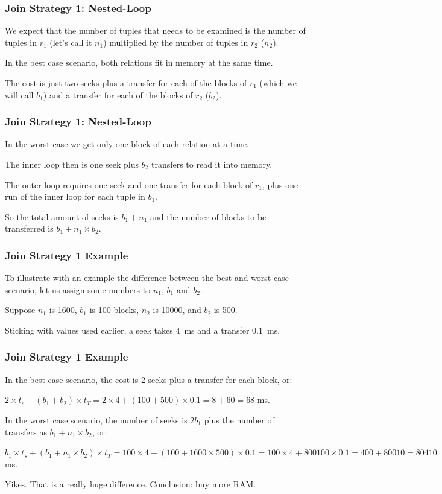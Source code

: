 \begin{frame}
\frametitle{Join Strategy 1: Nested-Loop}

We expect that the number of tuples that needs to be examined is the number of tuples in $r_{1}$ (let's call it $n_{1}$) multiplied by the number of tuples in $r_{2}$ ($n_{2}$). 

In the best case scenario, both relations fit in memory at the same time. 

The cost is just two seeks plus a transfer for each of the blocks of $r_{1}$ (which we will call $b_{1}$) and a transfer for each of the blocks of $r_{2}$ ($b_{2}$). 


\end{frame}


\begin{frame}
\frametitle{Join Strategy 1: Nested-Loop}

In the worst case we get only one block of each relation at a time. 

The inner loop then is one seek plus $b_{2}$ transfers to read it into memory.

The outer loop requires one seek and one transfer for each block of $r_{1}$, plus one run of the inner loop for each tuple in $b_{1}$. 

So the total amount of seeks is $b_{1} + n_{1}$ and the number of blocks to be transferred is $b_{1} + n_{1} \times b_{2}$.

\end{frame}

\begin{frame}
\frametitle{Join Strategy 1 Example}

To illustrate with an example the difference between the best and worst case scenario, let us assign some numbers to $n_{1}$, $b_{1}$ and $b_{2}$. 

Suppose $n_{1}$ is 1600, $b_{1}$ is 100 blocks, $n_{2}$ is 10000, and $b_{2}$ is 500. 

Sticking with values used earlier, a seek takes 4~ms and a transfer 0.1~ms. 

\end{frame}

\begin{frame}
\frametitle{Join Strategy 1 Example}

In the best case scenario, the cost is 2 seeks plus a transfer for each block, or: 

$2 \times t_{s} + (b_{1} + b_{2}) \times t_{T} = 2 \times 4 + (100 + 500) \times 0.1 = 8 + 60 = 68$ ms. 

In the worst case scenario, the number of seeks is $2b_{1}$ plus the number of transfers as $b_{1} + n_{1} \times b_{2}$, or: 

$b_{1} \times t_{s} + (b_{1} + n_{1} \times b_{2}) \times t_{T} = 100 \times 4 + (100 + 1600 \times 500) \times 0.1 = 100 \times 4 + 800100 \times 0.1 = 400 + 80010 = 80410$ ms. 

Yikes. That is a really huge difference. Conclusion: buy more RAM.

\end{frame}

